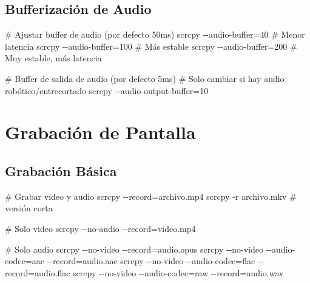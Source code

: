 \documentclass[
  doc,
  floatsintext,
  longtable,
  a4paper,
  nolmodern,
  notxfonts,
  notimes,
  12pt,
  colorlinks=true,linkcolor=blue,citecolor=blue,urlcolor=blue]{apa7}
\newenvironment{Shaded}{\begin{snugshade}}{\end{snugshade}}
\newcommand{\AttributeTok}[1]{\textcolor[rgb]{0.40,0.45,0.13}{#1}}
\newcommand{\CommentTok}[1]{\textcolor[rgb]{0.37,0.37,0.37}{#1}}
\newcommand{\ExtensionTok}[1]{\textcolor[rgb]{0.00,0.23,0.31}{#1}}
\newcommand{\NormalTok}[1]{\textcolor[rgb]{0.00,0.23,0.31}{#1}}
\newcommand{\OperatorTok}[1]{\textcolor[rgb]{0.37,0.37,0.37}{#1}}
\begin{document}
\subsection{Bufferización de Audio}\label{bufferizaciuxf3n-de-audio}

\begin{Shaded}
\begin{Highlighting}[]
\CommentTok{\# Ajustar buffer de audio (por defecto 50ms)}
\ExtensionTok{scrcpy} \AttributeTok{{-}{-}audio{-}buffer}\OperatorTok{=}\NormalTok{40    }\CommentTok{\# Menor latencia}
\ExtensionTok{scrcpy} \AttributeTok{{-}{-}audio{-}buffer}\OperatorTok{=}\NormalTok{100   }\CommentTok{\# Más estable}
\ExtensionTok{scrcpy} \AttributeTok{{-}{-}audio{-}buffer}\OperatorTok{=}\NormalTok{200   }\CommentTok{\# Muy estable, más latencia}

\CommentTok{\# Buffer de salida de audio (por defecto 5ms)}
\CommentTok{\# Solo cambiar si hay audio robótico/entrecortado}
\ExtensionTok{scrcpy} \AttributeTok{{-}{-}audio{-}output{-}buffer}\OperatorTok{=}\NormalTok{10}
\end{Highlighting}
\end{Shaded}

\section{Grabación de Pantalla}\label{grabaciuxf3n-de-pantalla}

\subsection{Grabación Básica}\label{grabaciuxf3n-buxe1sica}

\begin{Shaded}
\begin{Highlighting}[]
\CommentTok{\# Grabar video y audio}
\ExtensionTok{scrcpy} \AttributeTok{{-}{-}record}\OperatorTok{=}\NormalTok{archivo.mp4}
\ExtensionTok{scrcpy} \AttributeTok{{-}r}\NormalTok{ archivo.mkv  }\CommentTok{\# versión corta}

\CommentTok{\# Solo video}
\ExtensionTok{scrcpy} \AttributeTok{{-}{-}no{-}audio} \AttributeTok{{-}{-}record}\OperatorTok{=}\NormalTok{video.mp4}

\CommentTok{\# Solo audio}
\ExtensionTok{scrcpy} \AttributeTok{{-}{-}no{-}video} \AttributeTok{{-}{-}record}\OperatorTok{=}\NormalTok{audio.opus}
\ExtensionTok{scrcpy} \AttributeTok{{-}{-}no{-}video} \AttributeTok{{-}{-}audio{-}codec}\OperatorTok{=}\NormalTok{aac }\AttributeTok{{-}{-}record}\OperatorTok{=}\NormalTok{audio.aac}
\ExtensionTok{scrcpy} \AttributeTok{{-}{-}no{-}video} \AttributeTok{{-}{-}audio{-}codec}\OperatorTok{=}\NormalTok{flac }\AttributeTok{{-}{-}record}\OperatorTok{=}\NormalTok{audio.flac}
\ExtensionTok{scrcpy} \AttributeTok{{-}{-}no{-}video} \AttributeTok{{-}{-}audio{-}codec}\OperatorTok{=}\NormalTok{raw }\AttributeTok{{-}{-}record}\OperatorTok{=}\NormalTok{audio.wav}
\end{Highlighting}
\end{Shaded}
\end{document}
